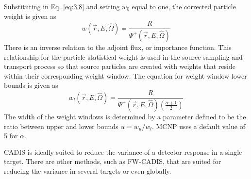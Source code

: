 Substituting in Eq. \ref{eq:3.8} and setting $w_0$ equal to one, the corrected 
particle weight is given as
\begin{equation} \label{eq:3.10}
	w(\overrightarrow{r}, E, \widehat{\Omega})=
	\frac{R}{\Psi^{+}(\overrightarrow{r}, E, \widehat{\Omega})}
\end{equation}
There is an inverse relation to the adjoint flux, or importance function.
This relationship for the particle statistical weight is used in the source sampling
and transport process so that source particles are created with weights that reside 
within their corresponding weight window.
The equation for weight window lower bounds
is given as 
\begin{equation} \label{eq:3.12}
	w_{l}(\overrightarrow{r}, E, \widehat{\Omega}) = 
	\frac{R}{\Psi^{+}(\overrightarrow{r}, E, \widehat{\Omega})
	(\frac{\alpha + 1}{2})}
\end{equation}
The width of the weight windows is determined by a parameter defined to be the
ratio between upper and lower bounds $\alpha =
w_{u}/w_{l}$.  MCNP uses a default value of 5 for $\alpha$.

CADIS is ideally suited to reduce the variance of a detector response in a single
target.  There are other methods, such as FW-CADIS, that are suited for reducing the variance in 
several targets or even globally.

